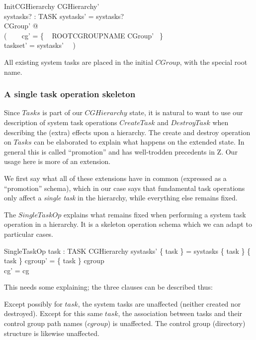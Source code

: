 \documentclass[a4paper,twoside,12pt]{article}
\begin{document}
\begin{schema}{InitCGHierarchy}
CGHierarchy' \\
systasks? : \finset TASK
\where
systasks' = systasks? \\
\exists CGroup' @ \\
( ~~~ cg' = \{ ~ ROOTCGROUPNAME \mapsto \theta CGroup' ~\} \\
\land taskset' = systasks' ~~)
\end{schema}
All existing system tasks are placed in the initial $CGroup$,
with the special root name.

\subsubsection{A single task operation skeleton}

Since $Tasks$ is part of our $CGHierarchy$ state, it is natural to want to use our description of system task operations $CreateTask$
and $DestroyTask$ when describing the (extra) effects upon a hierarchy. The create and destroy operation on
$Tasks$ can be elaborated to explain what happens on the extended state.
In general this is called ``promotion'' and has well-trodden precedents in Z. Our usage here is more of an extension.

We first say what all of these extensions have in common (expressed as a ``promotion'' schema),
which in our case says that fundamental task operations only affect a \emph{single task} in the hierarchy, while
everything else remains fixed.

The $SingleTaskOp$ explains what remains fixed when performing a system task operation in a hierarchy.
It is a skeleton operation schema which we can adapt to particular cases.

\begin{schema}{SingleTaskOp}
task : TASK
\also
\Delta CGHierarchy
\where
systasks' \setminus \{ task \} = systasks \setminus \{ task \}
\also
\{ task \} \ndres cgroup' = \{ task \} \ndres cgroup \\
\dom cg' = \dom cg
\end{schema}
This needs some explaining; the three clauses can be described thus:

Except possibly for $task$, the system tasks are unaffected (neither created nor destroyed).
Except for this same $task$, the association between tasks and their control group path names ($cgroup$) is unaffected.
The control group (directory) structure is likewise unaffected.
\end{document}
